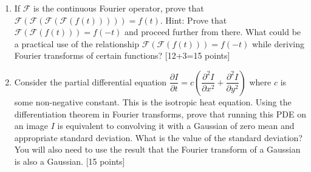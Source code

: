 \documentclass[11pt]{article}
\begin{document}
\begin{enumerate}
\item If $\mathcal{F}$ is the continuous Fourier operator, prove that $\mathcal{F}(\mathcal{F}(\mathcal{F}(\mathcal{F}(f(t))))) = f(t)$. Hint: Prove that $\mathcal{F}(\mathcal{F}(f(t))) = f(-t)$ and proceed further from there. What could be a practical use of the relationship $\mathcal{F}(\mathcal{F}(f(t))) = f(-t)$ while deriving Fourier transforms of certain functions? 
\textsf{[12+3=15 points]}

\item Consider the partial differential equation $\dfrac{\partial I}{\partial t} = c \left( \dfrac{\partial^2 I}{\partial x^2} + \dfrac{\partial^2 I}{\partial y^2} \right)$ where $c$ is some non-negative constant. This is the isotropic heat equation. Using the differentiation theorem in Fourier transforms, prove that running this PDE on an image $I$ is equivalent to convolving it with a Gaussian of zero mean and appropriate standard deviation. What is the value of the standard deviation? You will also need to use the result that the Fourier transform of a Gaussian is also a Gaussian. \textsf{[15 points]}
\end{enumerate}
\end{document}
